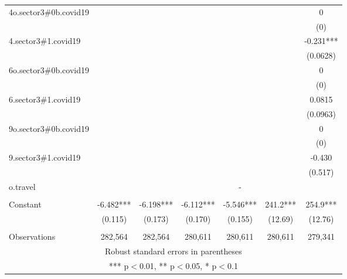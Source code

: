 \documentclass[]{article}
\begin{document}
\begin{tabular}{lcccccc}
4o.sector3\#0b.covid19 &  &  &  &  &  & 0 \\
 &  &  &  &  &  & (0) \\
4.sector3\#1.covid19 &  &  &  &  &  & -0.231*** \\
 &  &  &  &  &  & (0.0628) \\
6o.sector3\#0b.covid19 &  &  &  &  &  & 0 \\
 &  &  &  &  &  & (0) \\
6.sector3\#1.covid19 &  &  &  &  &  & 0.0815 \\
 &  &  &  &  &  & (0.0963) \\
9o.sector3\#0b.covid19 &  &  &  &  &  & 0 \\
 &  &  &  &  &  & (0) \\
9.sector3\#1.covid19 &  &  &  &  &  & -0.430 \\
 &  &  &  &  &  & (0.517) \\
o.travel &  &  &  & - &  &  \\
 &  &  &  &  &  &  \\
Constant & -6.482*** & -6.198*** & -6.112*** & -5.546*** & 241.2*** & 254.9*** \\
 & (0.115) & (0.173) & (0.170) & (0.155) & (12.69) & (12.76) \\
 &  &  &  &  &  &  \\
 Observations & 282,564 & 282,564 & 280,611 & 280,611 & 280,611 & 279,341 \\ \hline
\multicolumn{7}{c}{ Robust standard errors in parentheses} \\
\multicolumn{7}{c}{ *** p$<$0.01, ** p$<$0.05, * p$<$0.1} \\
\end{tabular}
\end{document}
